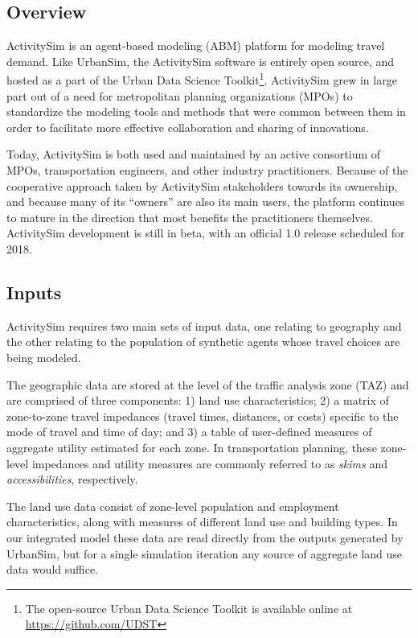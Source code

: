 \subsection{Overview}

ActivitySim is an agent-based modeling (ABM) platform for modeling travel demand. Like UrbanSim, the ActivitySim software is entirely open source, and hosted as a part of the Urban Data Science Toolkit\footnote{The open-source Urban Data Science Toolkit is available online at \url{https://github.com/UDST}}. ActivitySim grew in large part out of a need for metropolitan planning organizations (MPOs) to standardize the modeling tools and methods that were common between them in order to facilitate more effective collaboration and sharing of innovations.

Today, ActivitySim is both used and maintained by an active consortium of MPOs, transportation engineers, and other industry practitioners. Because of the cooperative approach taken by ActivitySim stakeholders towards its ownership, and because many of its \enquote{owners} are also its main users, the platform continues to mature in the direction that most benefits the practitioners themselves. ActivitySim development is still in beta, with an official 1.0 release scheduled for 2018.

\subsection{Inputs}

ActivitySim requires two main sets of input data, one relating to geography and the other relating to the population of synthetic agents whose travel choices are being modeled.

The geographic data are stored at the level of the traffic analysis zone (TAZ) and are comprised of three components: 1) land use characteristics; 2) a matrix of zone-to-zone travel impedances (travel times, distances, or costs) specific to the mode of travel and time of day; and 3) a table of user-defined measures of aggregate utility estimated for each zone. In transportation planning, these zone-level impedances and utility measures are commonly referred to as \emph{skims} and \emph{accessibilities}, respectively.

The land use data consist of zone-level population and employment characteristics, along with measures of different land use and building types. In our integrated model these data are read directly from the outputs generated by UrbanSim, but for a single simulation iteration any source of aggregate land use data would suffice.

